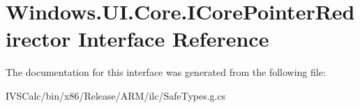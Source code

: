 \hypertarget{interface_windows_1_1_u_i_1_1_core_1_1_i_core_pointer_redirector}{}\section{Windows.\+U\+I.\+Core.\+I\+Core\+Pointer\+Redirector Interface Reference}
\label{interface_windows_1_1_u_i_1_1_core_1_1_i_core_pointer_redirector}


The documentation for this interface was generated from the following file\+:\begin{DoxyCompactItemize}
\item 
I\+V\+S\+Calc/bin/x86/\+Release/\+A\+R\+M/ilc/Safe\+Types.\+g.\+cs\end{DoxyCompactItemize}

